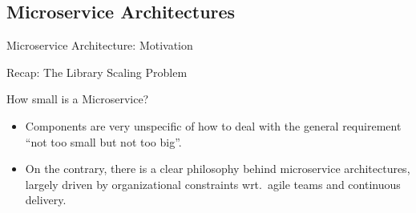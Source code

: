 \subsection{Microservice Architectures}
\begin{frame}{Microservice Architecture: Motivation}
	\begin{fancycolumns}[animation=none]
		\begin{note}{Recap: The Library Scaling Problem}
			\centering
		\end{note}
	\nextcolumn		
		\pause
		\begin{note}{How small is a Microservice?}
			\begin{itemize}
				\item Components are very unspecific of how to deal with the general requirement ``not too small but not too big''.
				\item On the contrary, there is a clear philosophy behind microservice architectures, largely driven by organizational constraints wrt.\ agile teams and continuous delivery.
			\end{itemize}
		\end{note}
		\pause
		\begin{definition}{}
		\end{definition}
	\end{fancycolumns}
\end{frame}

